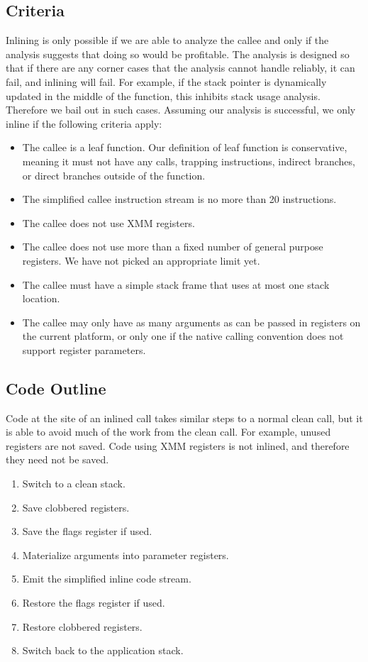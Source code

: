 \subsection{Criteria}

Inlining is only possible if we are able to analyze the callee and only if the
analysis suggests that doing so would be profitable.  The analysis is designed
so that if there are any corner cases that the analysis cannot handle reliably,
it can fail, and inlining will fail.  For example, if the stack pointer is
dynamically updated in the middle of the function, this inhibits stack usage
analysis.  Therefore we bail out in such cases.  Assuming our analysis is
successful, we only inline if the following criteria apply:

\begin{itemize}
\item The callee is a leaf function.  Our definition of leaf function is
conservative, meaning it must not have any calls, trapping instructions,
indirect branches, or direct branches outside of the function.
\item The simplified callee instruction stream is no more than 20 instructions.
\item The callee does not use XMM registers.
\item The callee does not use more than a fixed number of general purpose
registers.  We have not picked an appropriate limit yet.
\item The callee must have a simple stack frame that uses at most one stack
location.
\item The callee may only have as many arguments as can be passed in registers
on the current platform, or only one if the native calling convention does not
support register parameters.
\end{itemize}

\subsection{Code Outline}

Code at the site of an inlined call takes similar steps to a normal clean call,
but it is able to avoid much of the work from the clean call.  For example,
unused registers are not saved.  Code using XMM registers is not inlined, and
therefore they need not be saved.

\begin{enumerate}
\item Switch to a clean stack.
\item Save clobbered registers.
\item Save the flags register if used.
\item Materialize arguments into parameter registers.
\item Emit the simplified inline code stream.
\item Restore the flags register if used.
\item Restore clobbered registers.
\item Switch back to the application stack.
\end{enumerate}

